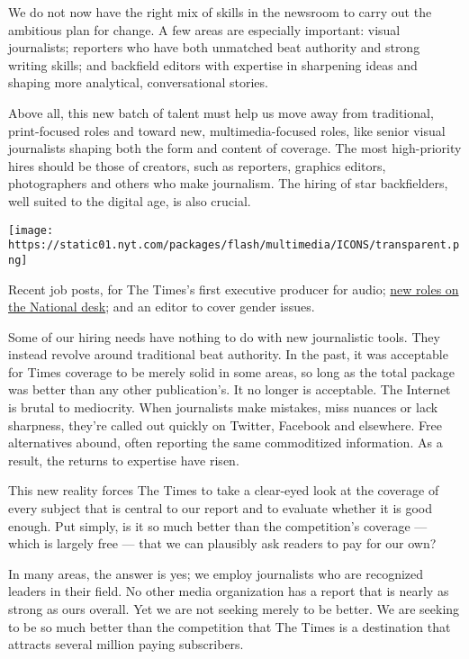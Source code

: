 We do not now have the right mix of skills in the newsroom to carry out
the ambitious plan for change. A few areas are especially important:
visual journalists; reporters who have both unmatched beat authority and
strong writing skills; and backfield editors with expertise in
sharpening ideas and shaping more analytical, conversational stories.

Above all, this new batch of talent must help us move away from
traditional, print-focused roles and toward new, multimedia-focused
roles, like senior visual journalists shaping both the form and content
of coverage. The most high-priority hires should be those of creators,
such as reporters, graphics editors, photographers and others who make
journalism. The hiring of star backfielders, well suited to the digital
age, is also crucial.

\texttt{[image: https://static01.nyt.com/packages/flash/multimedia/ICONS/transparent.png]}

Recent job posts, for The Times's first executive producer for audio;
\href{https://www.nytimes.com/interactive/2017/01/11/jobs/nyt-job-national-desk.html}{new
roles on the National desk}; and an editor to cover gender issues.

Some of our hiring needs have nothing to do with new journalistic tools.
They instead revolve around traditional beat authority. In the past, it
was acceptable for Times coverage to be merely solid in some areas, so
long as the total package was better than any other publication's. It no
longer is acceptable. The Internet is brutal to mediocrity. When
journalists make mistakes, miss nuances or lack sharpness, they're
called out quickly on Twitter, Facebook and elsewhere. Free alternatives
abound, often reporting the same commoditized information. As a result,
the returns to expertise have risen.

This new reality forces The Times to take a clear-eyed look at the
coverage of every subject that is central to our report and to evaluate
whether it is good enough. Put simply, is it so much better than the
competition's coverage --- which is largely free --- that we can
plausibly ask readers to pay for our own?

In many areas, the answer is yes; we employ journalists who are
recognized leaders in their field. No other media organization has a
report that is nearly as strong as ours overall. Yet we are not seeking
merely to be better. We are seeking to be so much better than the
competition that The Times is a destination that attracts several
million paying subscribers.

